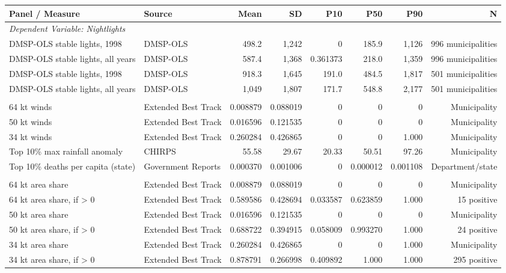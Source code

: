 \begin{tabular}{llrrrrrr}
\toprule
Panel / Measure & Source & Mean & SD & P10 & P50 & P90 & N \\
\midrule
\multicolumn{8}{l}{\emph{Dependent Variable: Nightlights}} \\
DMSP-OLS stable lights, 1998 & DMSP-OLS & 498.2 & 1,242 & 0 & 185.9 & 1,126 & 996 municipalities \\
DMSP-OLS stable lights, all years & DMSP-OLS & 587.4 & 1,368 & 0.361373 & 218.0 & 1,359 & 996 municipalities \\
DMSP-OLS stable lights, 1998 & DMSP-OLS & 918.3 & 1,645 & 191.0 & 484.5 & 1,817 & 501 municipalities \\
DMSP-OLS stable lights, all years & DMSP-OLS & 1,049 & 1,807 & 171.7 & 548.8 & 2,177 & 501 municipalities \\
\addlinespace[0.35em]
\multicolumn{8}{l}{\emph{Independent Variable: Mitch Exposure Measures}} \\
64 kt winds & Extended Best Track & 0.008879 & 0.088019 & 0 & 0 & 0 & Municipality \\
50 kt winds & Extended Best Track & 0.016596 & 0.121535 & 0 & 0 & 0 & Municipality \\
34 kt winds & Extended Best Track & 0.260284 & 0.426865 & 0 & 0 & 1.000 & Municipality \\
Top 10\% max rainfall anomaly & CHIRPS & 55.58 & 29.67 & 20.33 & 50.51 & 97.26 & Municipality \\
Top 10\% deaths per capita (state) & Government Reports & 0.000370 & 0.001006 & 0 & 0.000012 & 0.001108 & Department/state \\
\addlinespace[0.35em]
\multicolumn{8}{l}{\emph{Independent Variable: Continuous Mitch Exposure Measures}} \\
64 kt area share & Extended Best Track & 0.008879 & 0.088019 & 0 & 0 & 0 & Municipality \\
64 kt area share, if > 0 & Extended Best Track & 0.589586 & 0.428694 & 0.033587 & 0.623859 & 1.000 & 15 positive \\
50 kt area share & Extended Best Track & 0.016596 & 0.121535 & 0 & 0 & 0 & Municipality \\
50 kt area share, if > 0 & Extended Best Track & 0.688722 & 0.394915 & 0.058009 & 0.993270 & 1.000 & 24 positive \\
34 kt area share & Extended Best Track & 0.260284 & 0.426865 & 0 & 0 & 1.000 & Municipality \\
34 kt area share, if > 0 & Extended Best Track & 0.878791 & 0.266998 & 0.409892 & 1.000 & 1.000 & 295 positive \\

\end{tabular}
